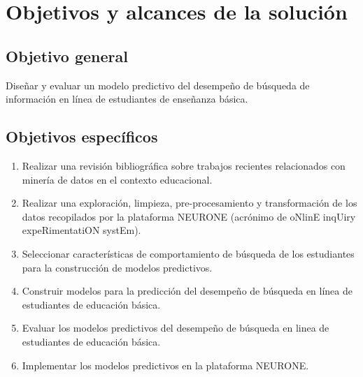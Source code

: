 \chapter{Objetivos y alcances de la solución}
\label{chp:objetivos}
\setcounter{page}{1}

\section{Objetivo general}
\label{sec:objetivo-general}
Diseñar y evaluar un modelo predictivo del desempeño de búsqueda de información en línea de estudiantes de enseñanza básica.

\section{Objetivos específicos}
\label{sec:objetivo-especificos}

\begin{enumerate}
	\item Realizar una revisión bibliográfica sobre trabajos recientes relacionados con minería de datos en el contexto educacional.
	\item Realizar una exploración, limpieza, pre-procesamiento y transformación de los datos recopilados por la plataforma NEURONE (acrónimo de oNlinE inqUiry expeRimentatiON systEm).
	\item Seleccionar características de comportamiento de búsqueda de los estudiantes para la construcción de modelos predictivos.
	\item Construir modelos para la predicción del desempeño de búsqueda en línea de estudiantes de educación básica.
	\item Evaluar los modelos predictivos del desempeño de búsqueda en linea de estudiantes de educación básica.
	\item Implementar los modelos predictivos en la plataforma NEURONE.
\end{enumerate}